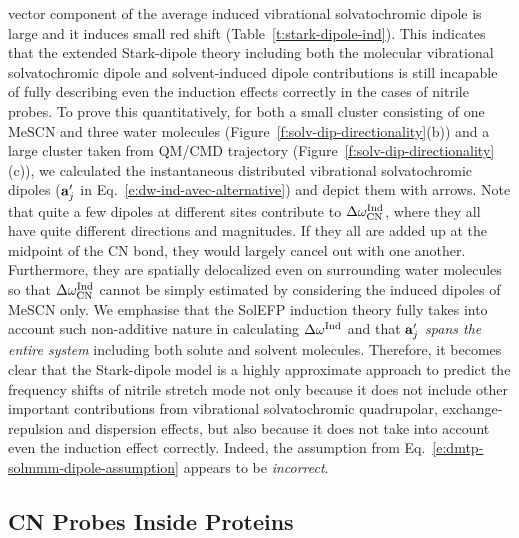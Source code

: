 \documentclass[b5paper,oneside,fleqn,11pt]{book}
\begin{document}
\begin{refsection}
vector component of the average induced vibrational
solvatochromic dipole is large and it induces small red shift
(Table~\ref{t:stark-dipole-ind}). This indicates that the extended Stark\hyp{}dipole theory
including both the molecular vibrational solvatochromic dipole
and solvent\hyp{}induced dipole contributions \citep{Fried.Wang.Boxer.Ren.Pande.JPCB.2013} 
is still incapable of
fully describing even the induction effects correctly in the
cases of nitrile probes. To prove this quantitatively, for both a
small cluster consisting of one MeSCN and three water
molecules (Figure~\ref{f:solv-dip-directionality}(b)) and a large cluster taken from QM/CMD
trajectory (Figure~\ref{f:solv-dip-directionality}(c)), we calculated the instantaneous distributed
vibrational solvatochromic dipoles (${\bf a}_j'$ in Eq.~\eqref{e:dw-ind-avec-alternative}) 
and depict
them with arrows. 
%
Note that quite a few dipoles at different
sites contribute to $\Delta\omega_{\rm CN}^{\rm Ind}$, 
where they all have quite different
directions and magnitudes. If they all are added up at the midpoint
of the CN bond, they would largely cancel out with one
another. Furthermore, they are spatially delocalized even on
surrounding water molecules so that $\Delta\omega_{\rm CN}^{\rm Ind}$
cannot be simply
estimated by considering the induced dipoles of MeSCN only.
We emphasise that the SolEFP induction theory fully takes into
account such non\hyp{}additive nature in calculating $\Delta\omega^{\rm Ind}$ 
and that
${\bf a}_j'$ \emph{spans the entire system} including both solute and solvent
molecules. \citep{Blasiak.Cho.JCP.2014} 
Therefore, it becomes clear that the Stark\hyp{}dipole
model is a highly approximate approach to predict the
frequency shifts of nitrile stretch mode not only because it
does not include other important contributions from
vibrational solvatochromic quadrupolar, exchange\hyp{}repulsion
and dispersion effects, but also because it does not take into
account even the induction effect correctly. Indeed, the assumption
from Eq.~\eqref{e:dmtp-solmmm-dipole-assumption} appears to be \emph{incorrect}.

\subsection{CN Probes Inside Proteins}


\end{refsection}
\end{document}
